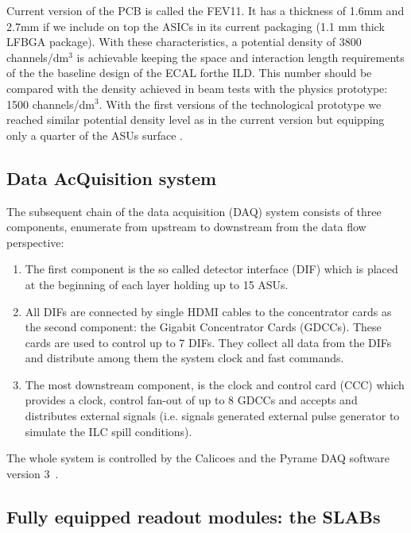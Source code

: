 \documentclass[a4paper,11pt]{article}
\begin{document}
Current version of the PCB is called the FEV11. It has a thickness of 1.6mm and 2.7mm
if we include on top the ASICs in its current packaging (1.1 mm thick LFBGA package).
With these characteristics, a potential density of
3800 channels/dm$^{3}$ is achievable keeping the space and
interaction length requirements of the the baseline design of the ECAL forthe ILD.
This number should be compared with
the density achieved in beam tests with the physics prototype: 1500 channels/dm$^{3}$.
With the first versions
of the technological prototype we reached similar potential density level as in
the current version but equipping only a
quarter of the ASUs surface \cite{Amjad:2014tha}.

\subsection{Data AcQuisition system}
\label{sec:DAQ}

The subsequent chain of the data acquisition (DAQ)\cite{Gastaldi:2014vaa} system consists of three components, enumerate from upstream to downstream from the data flow perspective:

\begin{enumerate}
\item The first component is the so called detector interface (DIF) which is placed at the beginning of each layer holding up to 15 ASUs.
\item All DIFs are connected by single HDMI cables to the concentrator cards as the second component: the Gigabit Concentrator Cards (GDCCs). These cards are used to control up to 7 DIFs. They collect all data from the DIFs and distribute among them the system clock and fast commands.
  \item The most downstream component, is the clock and control card (CCC) which
provides a clock, control fan-out of up to 8 GDCCs and accepts and distributes external signals (i.e. signals
generated external pulse generator to simulate the ILC spill conditions).
\end{enumerate}

The whole system is controlled by the Calicoes and the Pyrame DAQ software version 3~\cite{Rubio-Roy:2017ere,Magniette:2018wdz}.

\subsection{Fully equipped readout modules: the SLABs}
\label{sec:setup}
\end{document}
